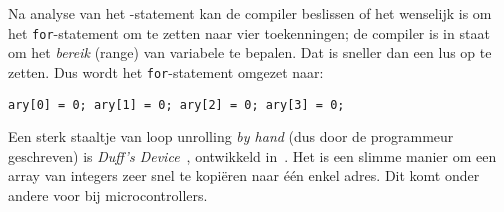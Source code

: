 Na analyse van het -statement kan de compiler beslissen of het wenselijk is om het \texttt{for}-statement om te zetten naar vier toekenningen; de compiler is in staat om het \textsl{bereik} (range) van variabele  te bepalen. Dat is sneller dan een lus op te zetten. Dus wordt het \texttt{for}-statement omgezet naar:

\begin{lstlisting}[style=lstoneline]
ary[0] = 0; ary[1] = 0; ary[2] = 0; ary[3] = 0;
\end{lstlisting}

Een sterk staaltje van loop unrolling \textsl{by hand} (dus door de programmeur geschreven) is \textsl{Duff's Device}~\cite{duffsdevice}, ontwikkeld in~\citeyear{duffsdevice}. Het is een slimme manier om een array van integers zeer snel te kopiëren naar één enkel adres. Dit komt onder andere voor bij microcontrollers.



